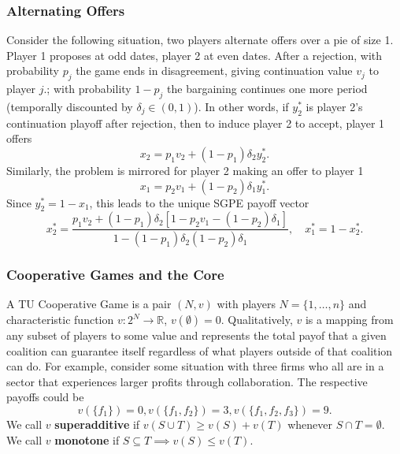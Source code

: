 \documentclass[11pt,english]{article}
\begin{document}
\subsubsection{Alternating Offers}
Consider the following situation, two players alternate offers over a pie of size 1. Player 1 proposes at odd dates, player 2 at even dates. After a rejection, with probability $p_j$ the game ends in disagreement, giving continuation value $v_j$ to player $j$.; with probability $1 - p_j$ the bargaining continues one more period (temporally discounted by $\delta_j\in (0,1)$). In other words, if $y_2^*$ is player 2's continuation playoff after rejection, then to induce player 2 to accept, player 1 offers
$$x_2 = p_1 v_2 + (1 - p_1)\delta_2 y_2^*.$$ Similarly, the problem is mirrored for player 2 making an offer to player 1$$x_1 = p_2 v_1 + (1 - p_2)\delta_1 y_1^*.$$ Since $y^*_2 = 1 - x_1$, this leads to the unique SGPE payoff vector
$$x_2^* = \frac{p_1v_2 + (1 - p_1)\delta_2[1 - p_2v_1 - (1 - p_2)\delta_1]}{1 - (1 - p_1)\delta_2(1 - p_2)\delta_1}, \quad x_1^* = 1 - x_2^*.$$

\subsubsection{Cooperative Games and the Core}

\begin{definition}
A TU Cooperative Game is a pair $(N,v)$ with players $N = \{1,\ldots, n\}$ and characteristic function $v:2^N \to \mathbb{R}$, $v(\emptyset) = 0$. Qualitatively, $v$ is a mapping from any subset of players to some value and represents the total payof that a given coalition can guarantee itself regardless of what players outside of that coalition can do. For example, consider some situation with three firms who all are in a sector that experiences larger profits through collaboration. The respective payoffs could be $$v(\{f_1\}) = 0, v(\{f_1, f_2\}) = 3, v(\{f_1, f_2, f_3\}) = 9.$$ We call $v$ \textbf{superadditive} if $v(S\cup T) \geq v(S) + v(T)$ whenever $S\cap T = \emptyset$. We call $v$ \textbf{monotone} if $S\subseteq T \implies v(S) \leq v(T)$.
\end{definition}
\end{document}
